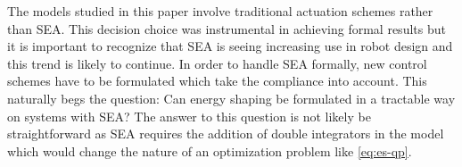 The models studied in this paper involve traditional actuation schemes rather
than SEA.
%
This decision choice was instrumental in achieving formal results but it is
important to recognize that SEA is seeing increasing use in robot design and
this trend is likely to continue.
%
In order to handle SEA formally, new control schemes have to be formulated which
take the compliance into account.
%
This naturally begs the question:
%
Can energy shaping be formulated in a tractable way on systems with SEA?
%
The answer to this question is not likely be straightforward as SEA requires the
addition of double integrators in the model which would change the nature of an
optimization problem like \eqref{eq:es-qp}.

